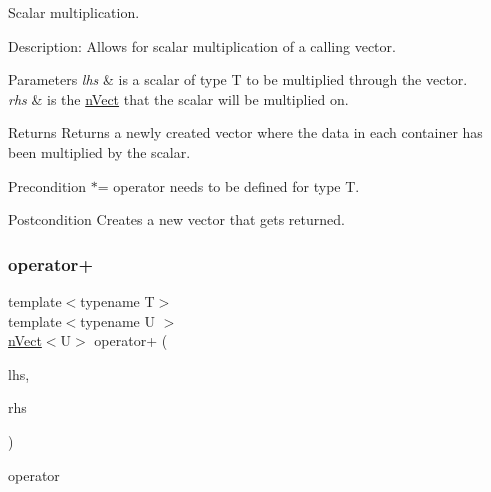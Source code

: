 Scalar multiplication. 

Description\+: Allows for scalar multiplication of a calling vector. 
\begin{DoxyParams}{Parameters}
{\em lhs} & is a scalar of type T to be multiplied through the vector. \\
\hline
{\em rhs} & is the \hyperlink{classnVect}{n\+Vect} that the scalar will be multiplied on. \\
\hline
\end{DoxyParams}
\begin{DoxyReturn}{Returns}
Returns a newly created vector where the data in each container has been multiplied by the scalar. 
\end{DoxyReturn}
\begin{DoxyPrecond}{Precondition}
$\ast$= operator needs to be defined for type T. 
\end{DoxyPrecond}
\begin{DoxyPostcond}{Postcondition}
Creates a new vector that gets returned. 
\end{DoxyPostcond}
\mbox{\label{classnVect_a3ffde125079f1f4fdfc8e99d6a714439}} 
\subsubsection{\texorpdfstring{operator+}{operator+}}
{\footnotesize\ttfamily template$<$typename T$>$ \\
template$<$typename U $>$ \\
\hyperlink{classnVect}{n\+Vect}$<$U$>$ operator+ (\begin{DoxyParamCaption}\item[{const \hyperlink{classnVect}{n\+Vect}$<$ U $>$ \&}]{lhs,  }\item[{const \hyperlink{classnVect}{n\+Vect}$<$ U $>$ \&}]{rhs }\end{DoxyParamCaption})\hspace{0.3cm}{\ttfamily [friend]}}




\begin{DoxyItemize}
\item operator 
\end{DoxyItemize}


